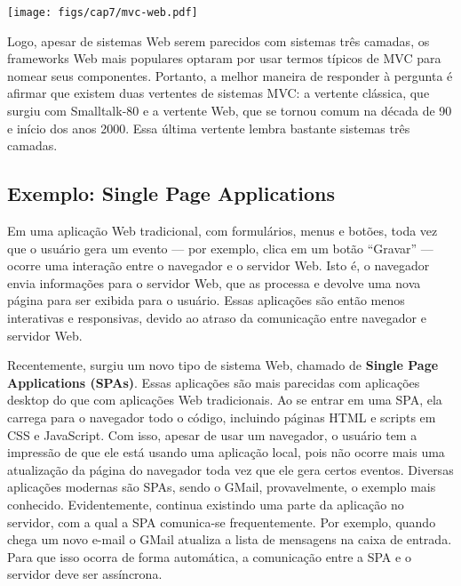 \documentclass[
  11pt,
  twoside]{book}
\let\origfigure\figure
\let\endorigfigure\endfigure
\renewenvironment{figure}[1][2] {
    \expandafter\origfigure\expandafter[!h]
} {
    \endorigfigure
}
\begin{document}
\begin{figure}
\centering
\texttt{[image: figs/cap7/mvc-web.pdf]}
\caption{Arquitetura MVC Web}
\end{figure}

Logo, apesar de sistemas Web serem parecidos com sistemas três camadas,
os frameworks Web mais populares optaram por usar termos típicos de MVC
para nomear seus componentes. Portanto, a melhor maneira de responder à
pergunta é afirmar que existem duas vertentes de sistemas MVC: a
vertente clássica, que surgiu com Smalltalk-80 e a vertente Web, que se
tornou comum na década de 90 e início dos anos 2000. Essa última
vertente lembra bastante sistemas três camadas.

\hypertarget{exemplo-single-page-applications}{%
\subsection{Exemplo: Single Page
Applications}\label{exemplo-single-page-applications}}


Em uma aplicação Web tradicional, com formulários, menus e botões, toda
vez que o usuário gera um evento --- por exemplo, clica em um botão
``Gravar'' --- ocorre uma interação entre o navegador e o servidor Web.
Isto é, o navegador envia informações para o servidor Web, que as
processa e devolve uma nova página para ser exibida para o usuário.
Essas aplicações são então menos interativas e responsivas, devido ao
atraso da comunicação entre navegador e servidor Web.

 Recentemente, surgiu um novo tipo de sistema Web, chamado
de \textbf{Single Page Applications (SPAs)}. Essas aplicações são mais
parecidas com aplicações desktop do que com aplicações Web tradicionais.
Ao se entrar em uma SPA, ela carrega para o navegador todo o código,
incluindo páginas HTML e scripts em CSS e JavaScript. Com isso, apesar
de usar um navegador, o usuário tem a impressão de que ele está usando
uma aplicação local, pois não ocorre mais uma atualização da página do
navegador toda vez que ele gera certos eventos. Diversas aplicações
modernas são SPAs, sendo o GMail, provavelmente, o exemplo mais
conhecido. Evidentemente, continua existindo uma parte da aplicação no
servidor, com a qual a SPA comunica-se frequentemente. Por exemplo,
quando chega um novo e-mail o GMail atualiza a lista de mensagens na
caixa de entrada. Para que isso ocorra de forma automática, a
comunicação entre a SPA e o servidor deve ser assíncrona.
\end{document}
